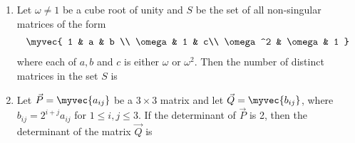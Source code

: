 \begin{enumerate}[label=\thesubsection.\arabic*.,ref=\thesubsection.\theenumi]
\begin{enumerate}
                \end{enumerate}
            \item Let $\omega \neq 1$ be a cube root of unity and $S$ be the set of all non-singular matrices of the form 
                \begin{align*}
                    \myvec{
                        1 & a & b \\
                        \omega & 1 & c\\
                        \omega^2 & \omega & 1
                    }
                \end{align*} where each of $a,b$ and $c$ is either $\omega$ or $\omega^2$. Then the number of distinct matrices in the set $S$ is
                \hfill{}

                \begin{enumerate}

                \end{enumerate}

            \item Let $\vec{P} = \myvec{a_{ij}}$ be a $3 \times 3$ matrix and let $\vec{Q} =  \myvec{b_{ij}}$, where $b_{ij} = 2^{i+j}a_{ij}$ for $1 \le i,j \le 3$. If the determinant of $\vec{P}$ is 2, then the determinant of the matrix $\vec{Q}$ is 
                \hfill{}
                \begin{enumerate}

                \end{enumerate}


\end{enumerate}
